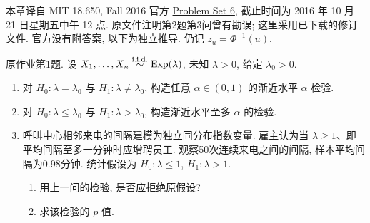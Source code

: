 \label{chap:ps06}
本章译自 MIT 18.650, Fall 2016 官方 \href{https://ocw.mit.edu/courses/18-650-statistics-for-applications-fall-2016/resources/problem-set-6/}{Problem Set 6}, 截止时间为 2016 年 10 月 21 日星期五中午 12 点. 原文件注明第2题第3问曾有勘误; 这里采用已下载的修订文件. 官方没有附答案, 以下为独立推导. 仍记 $z_u=\Phi^{-1}(u)$.

\begin{exercise}\label{ps06:p01}
原作业第1题. 设 $X_1,\ldots,X_n\stackrel{\mathrm{i.i.d.}}{\sim}\operatorname{Exp}(\lambda)$, 未知 $\lambda>0$, 给定 $\lambda_0>0$.
\begin{enumerate}[label=\arabic*.]
\item 对 $H_0:\lambda=\lambda_0$ 与 $H_1:\lambda\ne\lambda_0$, 构造任意 $\alpha\in(0,1)$ 的渐近水平 $\alpha$ 检验.
\item 对 $H_0:\lambda\le\lambda_0$ 与 $H_1:\lambda>\lambda_0$, 构造渐近水平至多 $\alpha$ 的检验.
\item 呼叫中心相邻来电的间隔建模为独立同分布指数变量. 雇主认为当 $\lambda\ge1$、即平均间隔至多一分钟时应增聘员工. 观察50次连续来电之间的间隔, 样本平均间隔为0.98分钟. 统计假设为 $H_0:\lambda\le1$, $H_1:\lambda>1$.
\begin{enumerate}[label=\alph*)]
\item 用上一问的检验, 是否应拒绝原假设?
\item 求该检验的 $p$ 值.
\end{enumerate}
\end{enumerate}
\end{exercise}
